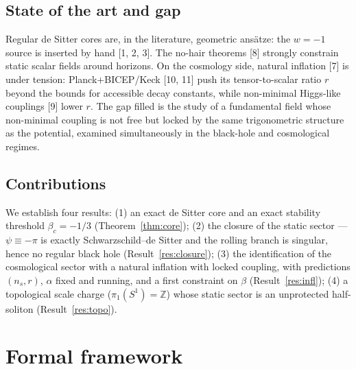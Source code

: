 \documentclass[11pt,a4paper]{article}
\theoremstyle{plain}
\theoremstyle{remark}
\begin{document}
\subsection{State of the art and gap}
Regular de Sitter cores are, in the literature, geometric ans\"atze: the $w=-1$ source is
inserted by hand [1, 2, 3]. The no-hair theorems [8] strongly constrain static scalar fields
around horizons. On the cosmology side, natural inflation [7] is under tension:
Planck$+$BICEP/Keck [10, 11] push its tensor-to-scalar ratio $r$ beyond the bounds for
accessible decay constants, while non-minimal Higgs-like couplings [9] lower $r$. The gap
filled is the study of a fundamental field whose non-minimal coupling is not free but locked
by the same trigonometric structure as the potential, examined simultaneously in the
black-hole and cosmological regimes.

\subsection{Contributions}
We establish four results: (1) an exact de Sitter core and an exact stability threshold
$\beta_c=-1/3$ (Theorem~\ref{thm:core}); (2) the closure of the static sector ---
$\psi\equiv-\pi$ is exactly Schwarzschild--de Sitter and the rolling branch is singular,
hence no regular black hole (Result~\ref{res:closure}); (3) the identification of the
cosmological sector with a natural inflation with locked coupling, with predictions
$(n_s,r)$, $\alpha$ fixed and running, and a first constraint on $\beta$
(Result~\ref{res:infl}); (4) a topological scale charge ($\pi_1(S^1)=\mathbb{Z}$) whose
static sector is an unprotected half-soliton (Result~\ref{res:topo}).

\section{Formal framework}
\end{document}
